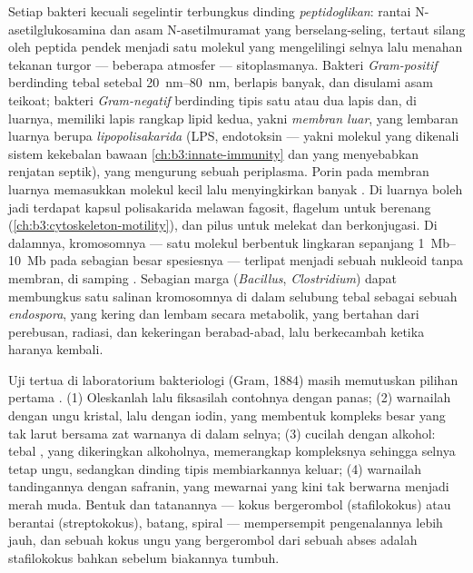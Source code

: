 \begin{definition}[Selubungnya]\label{def:b3:bacteriology:envelope}
%
Setiap bakteri kecuali segelintir terbungkus dinding \emph{peptidoglikan}:
rantai N-asetilglukosamina dan asam N-asetilmuramat yang berselang-seling,
tertaut silang oleh peptida pendek menjadi satu molekul yang mengelilingi
selnya lalu menahan tekanan turgor --- beberapa atmosfer --- sitoplasmanya.
Bakteri \emph{Gram-positif} berdinding tebal setebal
\qtyrange{20}{80}{nm}, berlapis banyak, dan disulami asam teikoat;
bakteri \emph{Gram-negatif} berdinding tipis satu atau dua lapis
dan, di luarnya, memiliki lapis rangkap lipid kedua, yakni \emph{membran
luar}, yang lembaran luarnya berupa \emph{lipopolisakarida} (LPS, endotoksin ---
yakni molekul yang dikenali sistem kekebalan bawaan
\cref{ch:b3:innate-immunity} dan yang menyebabkan renjatan septik),
yang mengurung sebuah periplasma. Porin pada membran luarnya memasukkan molekul
kecil lalu menyingkirkan banyak . Di luarnya boleh jadi terdapat
kapsul polisakarida melawan fagosit, flagelum untuk berenang
(\cref{ch:b3:cytoskeleton-motility}), dan pilus untuk melekat dan
berkonjugasi. Di dalamnya, kromosomnya --- satu molekul berbentuk lingkaran
sepanjang \qtyrange{1}{10}{Mb} pada sebagian besar spesiesnya --- terlipat
menjadi sebuah nukleoid tanpa membran, di samping . Sebagian marga
(\emph{Bacillus}, \emph{Clostridium}) dapat membungkus satu salinan kromosomnya
di dalam selubung tebal sebagai sebuah \emph{endospora}, yang kering dan lembam
secara metabolik, yang bertahan dari perebusan, radiasi, dan kekeringan
berabad-abad, lalu berkecambah ketika haranya kembali.
\end{definition}

\begin{method}\label{met:b3:bacteriology:gram}
Uji tertua di laboratorium bakteriologi (Gram, 1884) masih
memutuskan pilihan pertama . (1) Oleskanlah lalu fiksasilah
contohnya dengan panas; (2) warnailah dengan ungu kristal, lalu dengan iodin,
yang membentuk kompleks besar yang tak larut bersama zat warnanya di dalam
selnya; (3) cucilah dengan alkohol:  tebal , yang
dikeringkan alkoholnya, memerangkap kompleksnya sehingga selnya tetap ungu,
sedangkan dinding tipis  membiarkannya keluar; (4) warnailah
tandingannya dengan safranin, yang mewarnai  yang kini tak berwarna
menjadi merah muda. Bentuk dan tatanannya --- kokus bergerombol (stafilokokus)
atau berantai (streptokokus), batang, spiral --- mempersempit pengenalannya
lebih jauh, dan sebuah kokus ungu yang bergerombol dari sebuah abses adalah
stafilokokus bahkan sebelum biakannya tumbuh.
\end{method}

